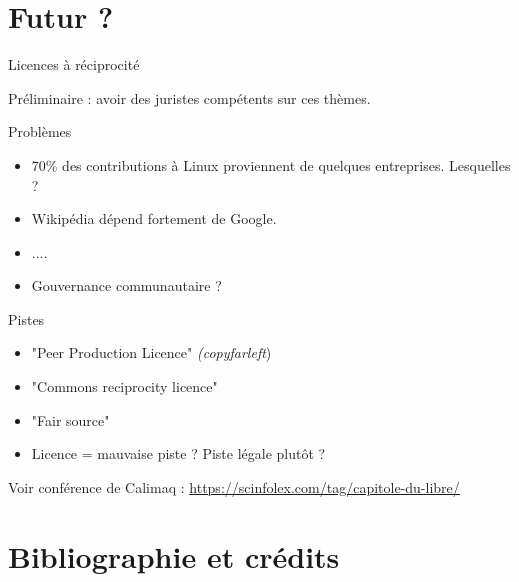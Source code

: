 \documentclass{beamer}
\begin{document}
\begin{frame}[plain]%
%  
\end{frame}



\section{Futur ?}

\begin{frame}{Licences à réciprocité}

Préliminaire : avoir des juristes compétents sur ces thèmes.

  \begin{block}{Problèmes}
    \begin{itemize}
    \item 70\% des contributions à Linux proviennent de quelques entreprises. Lesquelles ?
    \item Wikipédia dépend fortement de Google.
    \item ....
    \item Gouvernance communautaire ? 
    \end{itemize}
  \end{block}

  \begin{block}{Pistes}
    \begin{itemize}
    \item "Peer Production Licence" \textit{(copyfarleft})
    \item "Commons reciprocity licence"
    \item "Fair source"
    \item Licence = mauvaise piste ? Piste légale plutôt ?
    \end{itemize}
  
  \end{block}
  
Voir conférence de Calimaq : \url{https://scinfolex.com/tag/capitole-du-libre/}
  
\end{frame}

\section{Bibliographie et crédits}
\end{document}
